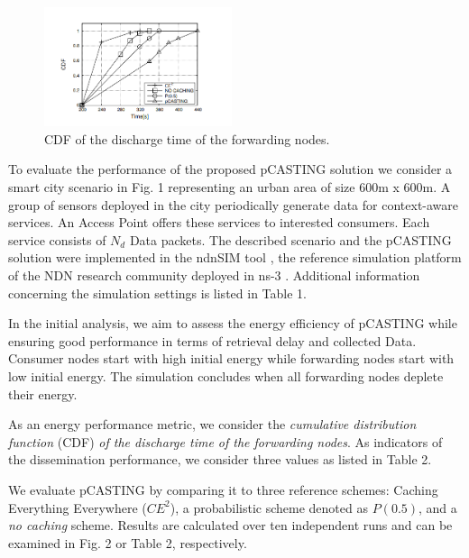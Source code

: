 \documentclass[conference]{IEEEtran}
\begin{document}
\begin{figure}[htbp]
    \centerline{\includegraphics[width=5.5cm]{fig2.png}}
    \caption{CDF of the discharge time of the forwarding nodes.}
    \label{fig2}
\end{figure}

To evaluate the performance of the proposed pCASTING solution we consider a smart city scenario in Fig. 1 representing an urban 
area of size 600m x 600m. A group of sensors deployed in the city periodically generate data for context-aware services. 
An Access Point offers these services to interested consumers. Each service consists of $N_d$ Data packets. The described scenario and the 
pCASTING solution were implemented in the ndnSIM tool \cite{b10}, the reference simulation platform of the NDN research community deployed 
in ns-3 \cite{b18}. Additional information concerning the simulation settings is listed in Table 1.

In the initial analysis, we aim to assess the energy efficiency of pCASTING while ensuring good performance in terms of retrieval delay and 
collected Data. Consumer nodes start with high initial energy while forwarding nodes start with low initial energy. The simulation concludes 
when all forwarding nodes deplete their energy.

As an energy performance metric, we consider the \textit{cumulative distribution function} (CDF) \textit{of the discharge time of the forwarding nodes}.
As indicators of the dissemination performance, we consider three values as listed in Table 2.

We evaluate pCASTING by comparing it to three reference schemes:
Caching Everything Everywhere ($CE^2$), a probabilistic scheme denoted as $P(0.5)$, and a \textit{no caching} scheme.
Results are calculated over ten independent runs and can be examined in Fig. 2 or Table 2, respectively.
\end{document}
